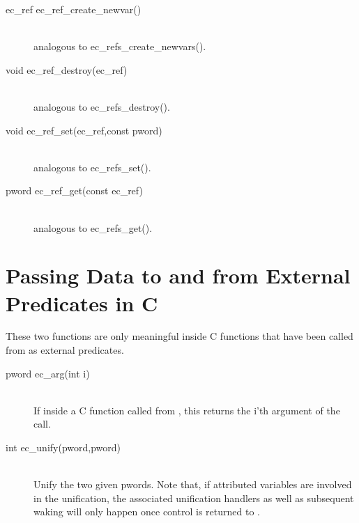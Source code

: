 \begin{description}
\item[ec_ref		ec_ref_create_newvar()]\ \\
	analogous to ec_refs_create_newvars().

\item[void		ec_ref_destroy(ec_ref)]\ \\
	analogous to ec_refs_destroy().

\item[void		ec_ref_set(ec_ref,const pword)]\ \\
	analogous to ec_refs_set().

\item[pword		ec_ref_get(const ec_ref)]\ \\
	analogous to ec_refs_get().
\end{description}


\section{Passing Data to and from External Predicates in C}
These two functions are only meaningful inside C functions that have been
called from {\eclipse} as external predicates.
\begin{description}
\item[pword		ec_arg(int i)]\ \\
	If inside a C function called from {\eclipse}, this returns the
	i'th argument of the call.

\item[int		ec_unify(pword,pword)]\ \\
	Unify the two given pwords. Note that, if attributed variables
	are involved in the unification, the associated unification handlers
	as well as subsequent waking will only happen once control is
	returned to {\eclipse}.
\end{description}


